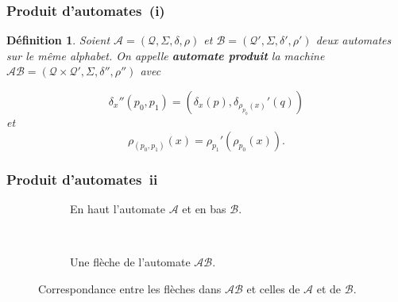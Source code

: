 \documentclass[11pt]{beamer}
\newtheorem{defi}{Définition}
\begin{document}
\begin{frame}
  \frametitle{Produit d'automates~(i)}
  \begin{defi}
    Soient $\mathcal{A} = \left(\mathcal{Q}, \Sigma, \delta, \rho\right)$ et $\mathcal{B} = \left(\mathcal{Q'}, \Sigma, \delta', \rho'\right)$ deux automates sur le même alphabet. On appelle \textbf{\textit{automate produit}} la machine $\mathcal{AB} = \left(\mathcal{Q}\times\mathcal{Q'}, \Sigma, \delta'', \rho''\right)$ avec

    \[ \delta_x''(p_0, p_1) = (\delta_x(p), \delta_{\rho_{p_0}(x)}'(q))\]
    et
    \[ \rho_{(p_0,p_1)}(x) = \rho_{p_1}'(\rho_{p_0}(x)). \]
  \end{defi}
\end{frame}

\begin{frame}
  \frametitle{Produit d'automates~ii}
  \begin{figure}[h!]
    \begin{subfigure}[b]{0.3\textwidth}
      \centering
      \caption{En haut l'automate $\mathcal{A}$ et en bas $\mathcal{B}$.}
    \end{subfigure}
    ~
    \begin{subfigure}[b]{0.3\textwidth}
      \centering
      \caption{Une flèche de l'automate $\mathcal{AB}$.}
    \end{subfigure}
    \caption{Correspondance entre les flèches dans $\mathcal{AB}$ et celles de $\mathcal{A}$ et de $\mathcal{B}$.}
  \end{figure}
\end{frame}
\end{document}
